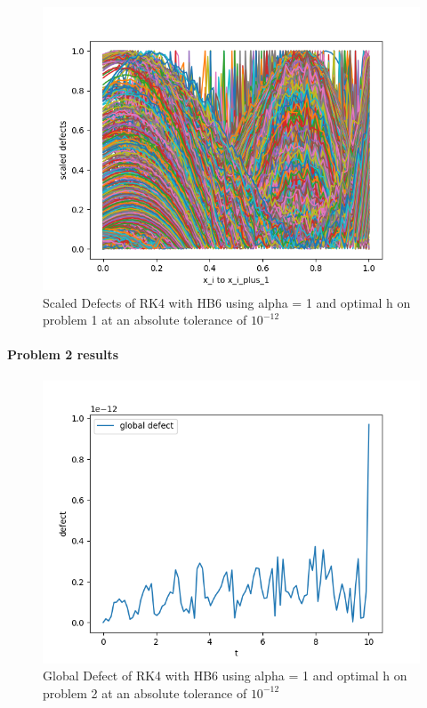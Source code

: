 \documentclass{article}
\begin{document}
\begin{figure}[H]
\centering
\includegraphics[width=0.7\linewidth]{./figures/sharp_tolerance_rk4_with_hb6_p1_scaled_defects}
\caption{Scaled Defects of RK4 with HB6 using alpha = 1 and optimal h on problem 1 at an absolute tolerance of $10^{-12}$}
\label{fig:sharp_tolerance_rk4_with_hb6_p1_scaled_defects}
\end{figure}

\paragraph{Problem 2 results}
\begin{figure}[H]
\centering
\includegraphics[width=0.7\linewidth]{./figures/sharp_tolerance_rk4_with_hb6_p2_global_defect}
\caption{Global Defect of RK4 with HB6 using alpha = 1 and optimal h on problem 2 at an absolute tolerance of $10^{-12}$}
\label{fig:sharp_tolerance_rk4_with_hb6_p2_global_defect}
\end{figure}
\end{document}

